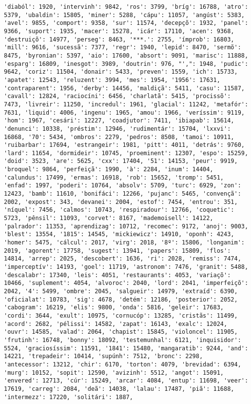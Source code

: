 \begin{Verbatim}[commandchars=\\\{\}]
'diaból': 1920, 'intervinh': 9842, 'ros': 3799, 'bríg': 16788, 'atro': 5379, 'ubaldin': 15805, 'miner': 5288, 'cápu': 11057, 'angúst': 5383, 'avel': 9855, 'comport': 9358, 'sur': 11574, 'decepçõ': 1932, 'panel': 9366, 'suport': 1935, 'macer': 15278, 'icár': 17110, 'acen': 9368, 'destruiçõ': 14977, 'perseg': 8463, '***.': 2755, 'ímprob': 16803, 'mill': 9616, 'sucessã': 7377, 'regr': 1940, 'lepid': 8470, 'sermõ': 8475, 'byronian': 5397, 'aio': 17600, 'absort': 9091, 'marisc': 11888, 'esparg': 16809, 'inesgot': 3989, 'doutrin': 976, "',": 1948, 'pudic': 9642, 'coriz': 11504, 'donair': 5433, 'preven': 1559, 'ich': 15733, 'apatet': 12543, 'reluzent': 3994, 'mes': 1954, '1956': 17631, 'contraparent': 1956, 'derby': 14456, 'maldiçã': 5411, 'casu': 11587, 'cavall': 12824, 'raciocíni': 6456, 'charlatã': 5415, 'procissõ': 7473, 'livreir': 11250, 'incredul': 1961, 'glacial': 11242, 'metafór': 7631, 'liquid': 4006, 'ingenu': 1965, 'amou': 1966, 'veríssim': 9119, 'hom': 1967, 'cesári': 12227, 'coadjutor': 7411, 'ibiapab': 15614, 'denunci': 10338, 'préstim': 12946, 'rudimentár': 15704, 'lxxvi': 16868, '70': 5434, 'ombros': 2279, 'pedros': 8508, 'tamoi': 10911, 'ruibarbar': 17694, 'estrangeir': 1981, 'pitt': 4011, 'detrás': 9760, 'lard': 11654, 'dormideir': 10745, 'proeminent': 12307, 'espo': 15259, 'doid': 3523, 'are': 5625, 'cxx': 17404, '51': 14153, 'peur': 9919, 'broquel': 9864, 'perfeiçã': 1990, 'à': 2284, 'inum': 14404, 'calundus': 17499, 'ermas': 16918, 'rob': 15652, 'tromp': 5451, 'enfad': 1997, 'poderi': 10764, 'absolv': 5709, 'turc': 6929, 'zon': 12423, 'bamb': 11610, 'bonifáci': 12266, 'pujanc': 5465, 'convençã': 2002, 'expost': 343, 'devanei': 2004, 'estof': 7454, 'entrou': 351, 'níquel': 7456, 'calmos': 10743, 'respiradour': 12766, 'coquetic': 5723, 'pênsil': 11093, 'corvet': 8167, 'mademoisell': 14122, 'palrador': 11353, 'aprendizag': 10712, 'recomec': 9172, 'anoj': 9003, 'blest': 13554, '1815': 14545, 'mickiewicz': 14910, 'oponh': 4243, 'homer': 5475, 'cálcul': 2017, 'virg': 2018, '8º': 15806, 'longanim': 2019, 'agorent': 17758, 'sugest': 13941, 'papers': 15809, 'flos': 14814, 'arrep': 2025, 'descobert': 1636, 'ri': 2028, 'remiss': 7474, 'imperceptív': 14193, 'goel': 11719, 'astronom': 7476, 'granit': 5488, 'descalabr': 17340, 'leis': 4051, 'restaurants': 4053, 'variaçõ': 10466, 'suplement': 4054, 'alvoroc': 2040, 'lord': 2041, 'imperfeiçõ': 2042, '4': 5499, 'ombre': 2045, 'salgueir': 14979, 'extraíd': 6390, 'oficialat': 10783, 'sig': 4678, 'detém': 12186, 'posterior': 2052, 'cabogram': 16219, 'elis': 9800, 'onda': 5816, 'geleir': 17683, 'cordi': 3644, 'exult': 10975, 'cornucóp': 13285, 'cristãs': 11499, 'acord': 2682, 'pélissi': 14582, 'zapat': 16143, 'exalc': 12024, 'ouvr': 14585, 'valad': 2064, 'chapist': 15845, 'violoncel': 11905, 'frutinh': 16748, 'bonny': 18092, 'testemunhal': 6121, 'inquisidor': 5524, 'graciosíssim': 11591, '1841': 15480, 'mangaratib': 9244, 'and': 14221, 'trepadeir': 10414, 'supúnh': 7512, 'bronc': 2298, 'antecessor': 13212, 'chir': 6170, 'torton': 4079, 'brevidad': 6394, 'murg': 10152, 'sopit': 12590, 'avizinh': 5512, 'angot': 15091, 'envered': 12713, 'cúr': 15249, 'arcar': 4084, 'entup': 11698, 'veer': 17619, 'carreg': 2084, 'deã': 14038, 'lalau': 17487, 'piã': 11688, 'intermezz': 17220, 'solitári': 1887, 
\end{Verbatim}
